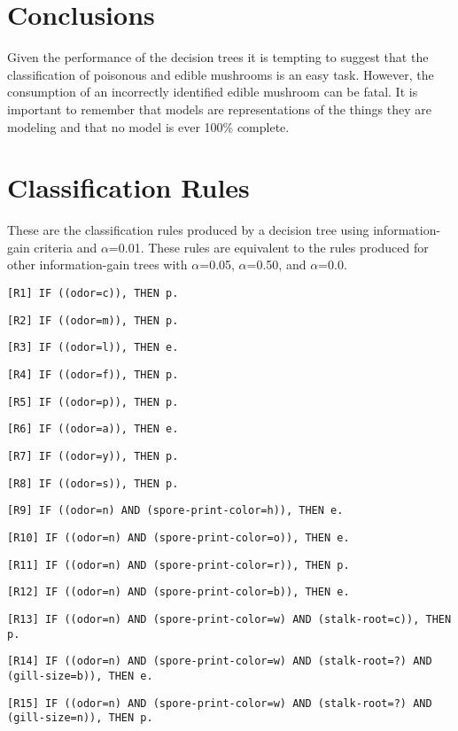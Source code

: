 \documentclass{IEEEtran}
\begin{document}
\section{Conclusions}
Given the performance of the decision trees it is tempting to suggest
that the classification of poisonous and edible mushrooms is an easy
task. However, the consumption of an incorrectly identified edible
mushroom can be fatal. It is important to remember that models are
representations of the things they are modeling and that no model is
ever 100\% complete. 

\printbibliography

\newpage
\onecolumn
\appendix
\section{ Classification Rules}
These are the classification rules produced by a decision tree using
information-gain criteria and $\alpha$=0.01. These rules are equivalent to
the rules produced for other information-gain trees with $\alpha$=0.05,
$\alpha$=0.50, and $\alpha$=0.0.

\texttt{[R1] IF ((odor=c)), THEN p.}

\texttt{[R2] IF ((odor=m)), THEN p.}

\texttt{[R3] IF ((odor=l)), THEN e.}

\texttt{[R4] IF ((odor=f)), THEN p.}

\texttt{[R5] IF ((odor=p)), THEN p.}

\texttt{[R6] IF ((odor=a)), THEN e.}

\texttt{[R7] IF ((odor=y)), THEN p.}

\texttt{[R8] IF ((odor=s)), THEN p.}

\texttt{[R9] IF ((odor=n) AND (spore-print-color=h)), THEN e.}

\texttt{[R10] IF ((odor=n) AND (spore-print-color=o)), THEN e.}

\texttt{[R11] IF ((odor=n) AND (spore-print-color=r)), THEN p.}

\texttt{[R12] IF ((odor=n) AND (spore-print-color=b)), THEN e.}

\texttt{[R13] IF ((odor=n) AND (spore-print-color=w) AND
  (stalk-root=c)), THEN p.}

\texttt{[R14] IF ((odor=n) AND (spore-print-color=w) AND (stalk-root=?)
  AND (gill-size=b)), THEN e.}

\texttt{[R15] IF ((odor=n) AND (spore-print-color=w) AND (stalk-root=?)
  AND (gill-size=n)), THEN p.}
\end{document}
